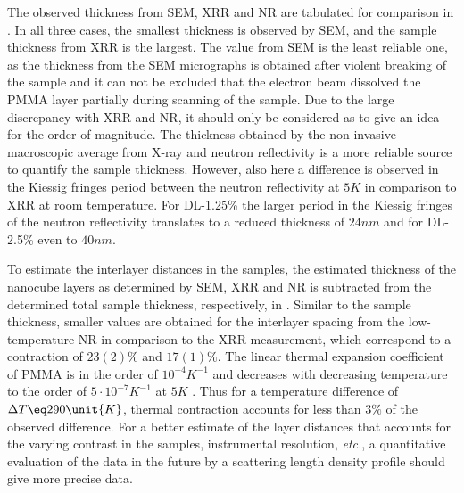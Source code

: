 \documentclass[\main/dresen_thesis.tex]{subfiles}
\begin{document}
  The observed thickness from SEM, XRR and NR are tabulated for comparison in .
  In all three cases, the smallest thickness is observed by SEM, and the sample thickness from XRR is the largest.
  The value from SEM is the least reliable one, as the thickness from the SEM micrographs is obtained after violent breaking of the sample and it can not be excluded that the electron beam dissolved the PMMA layer partially during scanning of the sample.
  Due to the large discrepancy with XRR and NR, it should only be considered as to give an idea for the order of magnitude.
  The thickness obtained by the non-invasive macroscopic average from X-ray and neutron reflectivity is a more reliable source to quantify the sample thickness.
  However, also here a difference is observed in the Kiessig fringes period between the neutron reflectivity at $5 \unit{K}$ in comparison to XRR at room temperature.
  For DL-1.25\% the larger period in the Kiessig fringes of the neutron reflectivity translates to a reduced thickness of $24 \unit{nm}$ and for DL-2.5\% even to $40 \unit{nm}$.

  To estimate the interlayer distances in the samples, the estimated thickness of the nanocube layers as determined by SEM, XRR and NR is subtracted from the determined total sample thickness, respectively, in .
  Similar to the sample thickness, smaller values are obtained for the interlayer spacing from the low-temperature NR in comparison to the XRR measurement, which correspond to a contraction of $23(2) \%$ and $17(1) \%$.
  The linear thermal expansion coefficient of PMMA is in the order of $10^{-4} \unit{K^{-1}}$ \cite{Michel_1986_Therm} and decreases with decreasing temperature to the order of $5 \cdot 10^{-7} \unit{K^{-1}}$ at $5 \unit{K}$ \cite{Lyon_1979_Tunne}.
  Thus for a temperature difference of $\Delta T \eq 290 \unit{K}$, thermal contraction accounts for less than $3 \%$ of the observed difference.
  For a better estimate of the layer distances that accounts for the varying contrast in the samples, instrumental resolution, \textit{etc.}, a quantitative evaluation of the data in the future by a scattering length density profile should give more precise data.
\end{document}
